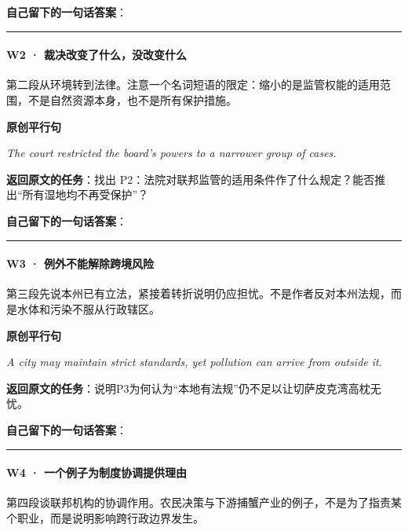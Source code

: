 \documentclass[
  11pt,
]{ctexart}
\renewenvironment{quote}{\begin{tcolorbox}[enhanced,breakable,colback=sand,colframe=primary!22,boxrule=0.4pt,arc=2pt,left=2.6mm,right=2.6mm,top=1.6mm,bottom=1.6mm]\itshape}{\end{tcolorbox}}
\begin{document}
\textbf{自己留下的一句话答案}：

\rule{0.75\linewidth}{0.35pt}

\paragraph{W2 ·
裁决改变了什么，没改变什么}\label{w2-ux88c1ux51b3ux6539ux53d8ux4e86ux4ec0ux4e48ux6ca1ux6539ux53d8ux4ec0ux4e48}

第二段从环境转到法律。注意一个名词短语的限定：缩小的是监管权能的适用范围，不是自然资源本身，也不是所有保护措施。

\textbf{原创平行句}

\begin{quote}
The court restricted the board's powers to a narrower group of cases.
\end{quote}

\textbf{返回原文的任务}：找出
P2：法院对联邦监管的适用条件作了什么规定？能否推出``所有湿地均不再受保护''？

\textbf{自己留下的一句话答案}：

\rule{0.75\linewidth}{0.35pt}

\paragraph{W3 ·
例外不能解除跨境风险}\label{w3-ux4f8bux5916ux4e0dux80fdux89e3ux9664ux8de8ux5883ux98ceux9669}

第三段先说本州已有立法，紧接着转折说明仍应担忧。不是作者反对本州法规，而是水体和污染不服从行政辖区。

\textbf{原创平行句}

\begin{quote}
A city may maintain strict standards, yet pollution can arrive from
outside it.
\end{quote}

\textbf{返回原文的任务}：说明P3为何认为``本地有法规''仍不足以让切萨皮克湾高枕无忧。

\textbf{自己留下的一句话答案}：

\rule{0.75\linewidth}{0.35pt}

\paragraph{W4 ·
一个例子为制度协调提供理由}\label{w4-ux4e00ux4e2aux4f8bux5b50ux4e3aux5236ux5ea6ux534fux8c03ux63d0ux4f9bux7406ux7531}

第四段谈联邦机构的协调作用。农民决策与下游捕蟹产业的例子，不是为了指责某个职业，而是说明影响跨行政边界发生。
\end{document}
